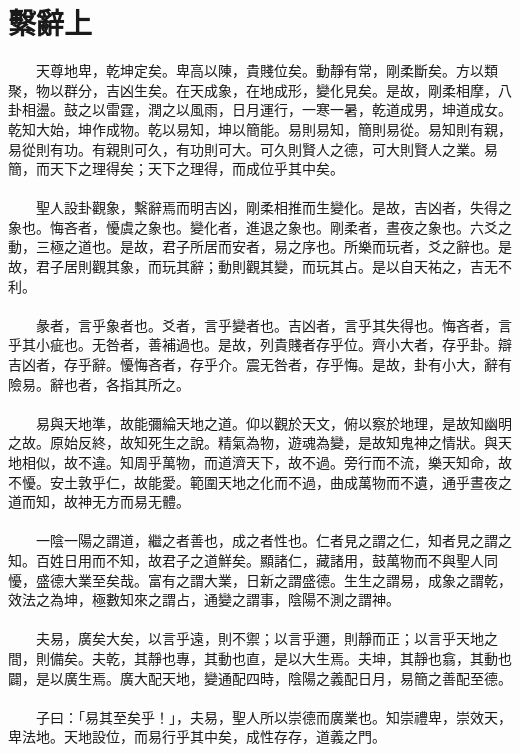 \section{繫辭上}
　　天尊地卑，乾坤定矣。卑高以陳，貴賤位矣。動靜有常，剛柔斷矣。方以類聚，物以群分，吉凶生矣。在天成象，在地成形，變化見矣。是故，剛柔相摩，八卦相盪。鼓之以雷霆，潤之以風雨，日月運行，一寒一暑，乾道成男，坤道成女。乾知大始，坤作成物。乾以易知，坤以簡能。易則易知，簡則易從。易知則有親，易從則有功。有親則可久，有功則可大。可久則賢人之德，可大則賢人之業。易簡，而天下之理得矣；天下之理得，而成位乎其中矣。
\\\\
　　聖人設卦觀象，繫辭焉而明吉凶，剛柔相推而生變化。是故，吉凶者，失得之象也。悔吝者，懮虞之象也。變化者，進退之象也。剛柔者，晝夜之象也。六爻之動，三極之道也。是故，君子所居而安者，易之序也。所樂而玩者，爻之辭也。是故，君子居則觀其象，而玩其辭；動則觀其變，而玩其占。是以自天祐之，吉无不利。
\\\\
　　彖者，言乎象者也。爻者，言乎變者也。吉凶者，言乎其失得也。悔吝者，言乎其小疵也。无咎者，善補過也。是故，列貴賤者存乎位。齊小大者，存乎卦。辯吉凶者，存乎辭。懮悔吝者，存乎介。震无咎者，存乎悔。是故，卦有小大，辭有險易。辭也者，各指其所之。
\\\\
　　易與天地準，故能彌綸天地之道。仰以觀於天文，俯以察於地理，是故知幽明之故。原始反終，故知死生之說。精氣為物，遊魂為變，是故知鬼神之情狀。與天地相似，故不違。知周乎萬物，而道濟天下，故不過。旁行而不流，樂天知命，故不懮。安土敦乎仁，故能愛。範圍天地之化而不過，曲成萬物而不遺，通乎晝夜之道而知，故神无方而易无體。
\\\\
　　一陰一陽之謂道，繼之者善也，成之者性也。仁者見之謂之仁，知者見之謂之知。百姓日用而不知，故君子之道鮮矣。顯諸仁，藏諸用，鼓萬物而不與聖人同懮，盛德大業至矣哉。富有之謂大業，日新之謂盛德。生生之謂易，成象之謂乾，效法之為坤，極數知來之謂占，通變之謂事，陰陽不測之謂神。
\\\\
　　夫易，廣矣大矣，以言乎遠，則不禦；以言乎邇，則靜而正；以言乎天地之間，則備矣。夫乾，其靜也專，其動也直，是以大生焉。夫坤，其靜也翕，其動也闢，是以廣生焉。廣大配天地，變通配四時，陰陽之義配日月，易簡之善配至德。
\\\\
　　子曰：「易其至矣乎！」，夫易，聖人所以崇德而廣業也。知崇禮卑，崇效天，卑法地。天地設位，而易行乎其中矣，成性存存，道義之門。
\\\\
